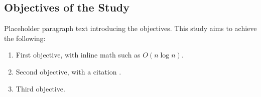 \subsection{Objectives of the Study}
Placeholder paragraph text introducing the objectives. This study aims to achieve the following:

\begin{enumerate}
    \item First objective, with inline math such as $O(n \log n)$.
    \item Second objective, with a citation \cite{dijkstra1959note}.
    \item Third objective.
\end{enumerate}